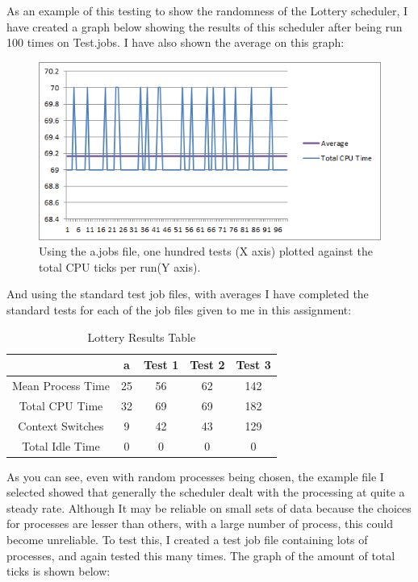 \documentclass{sig-alternate}
\begin{document}
As an example of this testing to show the randomness of the Lottery scheduler, I
have created a graph below showing the results of this scheduler after being run
100 times on Test.jobs. I have also shown the average on this graph:
\begin{figure}[!h]
\centering
\includegraphics[scale=0.6]{images/lottery1.png}
\caption{Using the a.jobs file, one hundred tests (X axis) plotted against the
total CPU ticks per run(Y axis).}
\end{figure}

And using the standard test job files, with averages I have completed the
standard tests for each of the job files given to me in this assignment:
\begin{table}[!h]
\centering
\caption{Lottery Results Table}
\begin{tabular}{|c|c|c|c|c|} \hline
&a&Test 1&Test 2&Test 3\\ \hline
Mean Process Time&25&56&62&142\\ \hline
Total CPU Time&32&69&69&182\\ \hline
Context Switches&9&42&43&129\\ \hline
Total Idle Time&0&0&0&0\\ \hline
\end{tabular}
\end{table}

As you can see, even with random processes being chosen, the example file I
selected showed that generally the scheduler dealt with the processing at quite
a steady rate. Although It may be reliable on small sets of data because the
choices for processes are lesser than others, with a large number of process,
this could become unreliable. To test this, I created a test job file containing
lots of processes, and again tested this many times. The graph of the amount of
total ticks is shown below:
\end{document}
